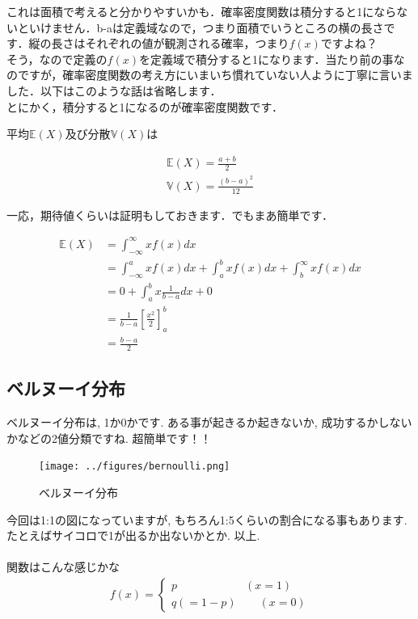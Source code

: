 \documentclass[11pt,a4paper,uplatex]{ujreport} 	%
\begin{document}
これは面積で考えると分かりやすいかも．確率密度関数は積分すると1にならないといけません．b-aは定義域なので，つまり面積でいうところの横の長さです．縦の長さはそれぞれの値が観測される確率，つまり$f(x)$ですよね？\\

そう，なので定義の$f(x)$を定義域で積分すると1になります．当たり前の事なのですが，確率密度関数の考え方にいまいち慣れていない人ように丁寧に言いました．以下はこのような話は省略します．\\

とにかく，積分すると1になるのが確率密度関数です．


平均$\mathbb{E}(X)$及び分散$\mathbb{V}(X)$は

\begin{align}
\mathbb{E}(X) = \frac{a+b}{2}\\
\mathbb{V}(X) = \frac{(b-a)^2}{12}
\end{align}

一応，期待値くらいは証明もしておきます．でもまあ簡単です．

\begin{align}
\mathbb{E}(X)  &= \int_{-\infty}^{\infty} xf(x) dx \\
&= \int_{-\infty}^{a} xf(x) dx + \int_{a}^{b} xf(x) dx + \int_{b}^{\infty} xf(x) dx \\
&= 0 + \int_{a}^{b} x\frac{1}{b-a} dx + 0\\
&= \frac{1}{b-a}\left[\frac{x^2}{2}\right]_a^b\\
& = \frac{b-a}{2}
\end{align}

\subsection{ベルヌーイ分布}
ベルヌーイ分布は, 1か0かです. ある事が起きるか起きないか, 成功するかしないかなどの2値分類ですね. 超簡単です！！\\

\begin{figure}[H]
\label{im:bernoulli}
  \centering
  \texttt{[image: ../figures/bernoulli.png]}
  \caption{ベルヌーイ分布}
\end{figure}

今回は1:1の図になっていますが, もちろん1:5くらいの割合になる事もあります. たとえばサイコロで1が出るか出ないかとか. 以上.\\
\\

関数はこんな感じかな
\begin{align}
f(x)=
  \left\{
    \begin{array}{l}
      p \qquad \qquad \qquad (x = 1) \\
      q(=1-p)  \qquad (x=0)
    \end{array}
  \right.
\end{align}
\end{document}
